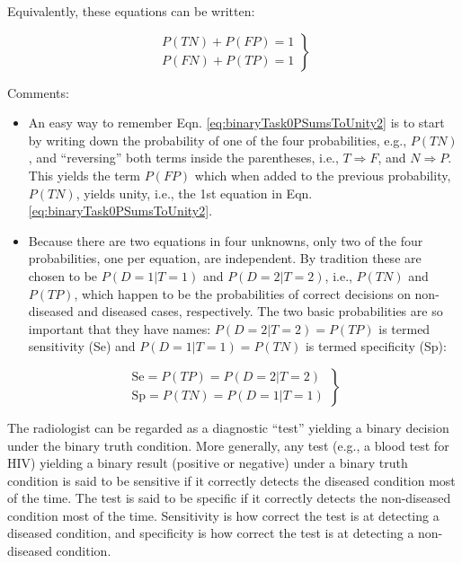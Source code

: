 \documentclass[
]{book}
\providecommand{\tightlist}{%
  \setlength{\itemsep}{0pt}\setlength{\parskip}{0pt}}
\begin{document}
Equivalently, these equations can be written:

\begin{equation} 
\left.\begin{matrix}
P(TN)+P(FP)=1\\ 
P(FN)+P(TP)=1
\end{matrix}\right\}
\label{eq:binaryTask0PSumsToUnity2}
\end{equation}

Comments:

\begin{itemize}
\tightlist
\item
  An easy way to remember Eqn. \eqref{eq:binaryTask0PSumsToUnity2} is to start by writing down the probability of one of the four probabilities, e.g., \(P(TN)\), and ``reversing'' both terms inside the parentheses, i.e., \(T \Rightarrow F\), and \(N \Rightarrow P\). This yields the term \(P(FP)\) which when added to the previous probability, \(P(TN)\), yields unity, i.e., the 1st equation in Eqn. \eqref{eq:binaryTask0PSumsToUnity2}.
\item
  Because there are two equations in four unknowns, only two of the four probabilities, one per equation, are independent. By tradition these are chosen to be \(P(D=1|T=1)\) and \(P(D=2|T=2)\), i.e., \(P(TN)\) and \(P(TP)\), which happen to be the probabilities of correct decisions on non-diseased and diseased cases, respectively. The two basic probabilities are so important that they have names: \(P(D=2|T=2)=P(TP)\) is termed sensitivity (Se) and \(P(D=1|T=1)=P(TN)\) is termed specificity (Sp):
\end{itemize}

\begin{equation} 
\left.\begin{matrix}
\text{Se}=P(TP)=P(D=2|T=2)\\ 
\text{Sp}=P(TN)=P(D=1|T=1)
\end{matrix}\right\}
\label{eq:binaryTask0SeSp}
\end{equation}

The radiologist can be regarded as a diagnostic ``test'' yielding a binary decision under the binary truth condition. More generally, any test (e.g., a blood test for HIV) yielding a binary result (positive or negative) under a binary truth condition is said to be sensitive if it correctly detects the diseased condition most of the time. The test is said to be specific if it correctly detects the non-diseased condition most of the time. Sensitivity is how correct the test is at detecting a diseased condition, and specificity is how correct the test is at detecting a non-diseased condition.
\end{document}
